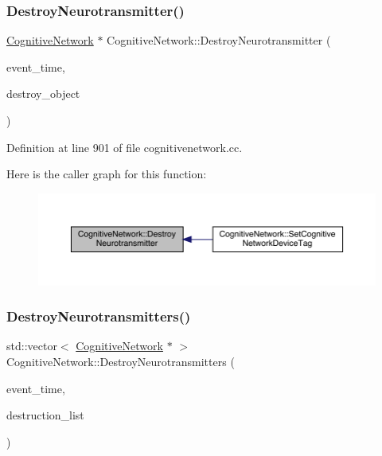 \subsubsection{\texorpdfstring{Destroy\+Neurotransmitter()}{DestroyNeurotransmitter()}}
{\footnotesize\ttfamily \hyperlink{class_cognitive_network}{Cognitive\+Network} $\ast$ Cognitive\+Network\+::\+Destroy\+Neurotransmitter (\begin{DoxyParamCaption}\item[{std\+::chrono\+::time\+\_\+point$<$ \hyperlink{universe_8h_a0ef8d951d1ca5ab3cfaf7ab4c7a6fd80}{Clock} $>$}]{event\+\_\+time,  }\item[{\hyperlink{class_cognitive_network}{Cognitive\+Network} $\ast$}]{destroy\+\_\+object }\end{DoxyParamCaption})}



Definition at line 901 of file cognitivenetwork.\+cc.

Here is the caller graph for this function\+:
\nopagebreak
\begin{figure}[H]
\begin{center}
\leavevmode
\includegraphics[width=350pt]{class_cognitive_network_a0f943978df49ef879c43c15c81682a8a_icgraph}
\end{center}
\end{figure}
\mbox{\label{class_cognitive_network_a7f705e562562e9778ee0b5260dda9f09}} 
\subsubsection{\texorpdfstring{Destroy\+Neurotransmitters()}{DestroyNeurotransmitters()}}
{\footnotesize\ttfamily std\+::vector$<$ \hyperlink{class_cognitive_network}{Cognitive\+Network} $\ast$ $>$ Cognitive\+Network\+::\+Destroy\+Neurotransmitters (\begin{DoxyParamCaption}\item[{std\+::chrono\+::time\+\_\+point$<$ \hyperlink{universe_8h_a0ef8d951d1ca5ab3cfaf7ab4c7a6fd80}{Clock} $>$}]{event\+\_\+time,  }\item[{std\+::vector$<$ \hyperlink{class_cognitive_network}{Cognitive\+Network} $\ast$$>$}]{destruction\+\_\+list }\end{DoxyParamCaption})}



